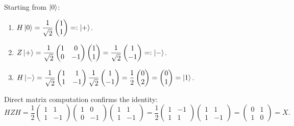 \documentclass[11pt,a4paper]{article}
\begin{document}
\medskip
Starting from $\ket{0}$:

\begin{enumerate}[label=\arabic*.]
  \item $H\ket{0}=\dfrac{1}{\sqrt{2}}\begin{pmatrix}1\\1\end{pmatrix}=:\ket{+}$.
  \item $Z\ket{+}=\dfrac{1}{\sqrt{2}}\begin{pmatrix}1&0\\0&-1\end{pmatrix}\begin{pmatrix}1\\1\end{pmatrix}
    =\dfrac{1}{\sqrt{2}}\begin{pmatrix}1\\-1\end{pmatrix}=:\ket{-}$.
  \item $H\ket{-}=\dfrac{1}{\sqrt{2}}\begin{pmatrix}1&1\\1&-1\end{pmatrix}\dfrac{1}{\sqrt{2}}\begin{pmatrix}1\\-1\end{pmatrix}
    =\dfrac{1}{2}\begin{pmatrix}0\\2\end{pmatrix}=\begin{pmatrix}0\\1\end{pmatrix}=\ket{1}$.
\end{enumerate}

Direct matrix computation confirms the identity:
\[
HZH=\frac{1}{2}\begin{pmatrix}1&1\\1&-1\end{pmatrix}\begin{pmatrix}1&0\\0&-1\end{pmatrix}\begin{pmatrix}1&1\\1&-1\end{pmatrix}
=\frac{1}{2}\begin{pmatrix}1&-1\\1&1\end{pmatrix}\begin{pmatrix}1&1\\1&-1\end{pmatrix}
=\begin{pmatrix}0&1\\1&0\end{pmatrix}=X.
\]
\end{document}
